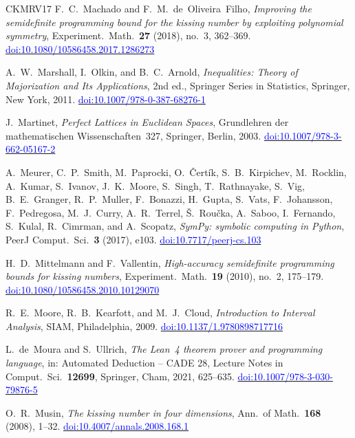 \documentclass[11pt,reqno]{amsart}
\newcommand{\bluelink}[2]{\href{#1}{\textcolor{blue}{#2}}}
\renewcommand{\_}{\origunderscore\allowbreak}
\numberwithin{equation}{section}
\theoremstyle{plain}
\theoremstyle{definition}
\theoremstyle{remark}
\begin{document}
\begin{thebibliography}{CKMRV17}
F.~C.~Machado and F.~M.~de~Oliveira~Filho,
\textit{Improving the semidefinite programming bound for the kissing number
by exploiting polynomial symmetry},
Experiment.\ Math.\ \textbf{27} (2018), no.~3, 362--369.
\bluelink{https://doi.org/10.1080/10586458.2017.1286273}{doi:10.1080/10586458.2017.1286273}

A.~W.~Marshall, I.~Olkin, and B.~C.~Arnold,
\textit{Inequalities: Theory of Majorization and Its Applications}, 2nd ed.,
Springer Series in Statistics, Springer, New York, 2011.
\bluelink{https://doi.org/10.1007/978-0-387-68276-1}{doi:10.1007/978-0-387-68276-1}

J.~Martinet,
\textit{Perfect Lattices in Euclidean Spaces},
Grundlehren der mathematischen Wissenschaften~327,
Springer, Berlin, 2003.
\bluelink{https://doi.org/10.1007/978-3-662-05167-2}{doi:10.1007/978-3-662-05167-2}

A.~Meurer, C.~P.~Smith, M.~Paprocki, O.~\v{C}ert\'ik,
S.~B.~Kirpichev, M.~Rocklin, A.~Kumar, S.~Ivanov, J.~K.~Moore,
S.~Singh, T.~Rathnayake, S.~Vig, B.~E.~Granger, R.~P.~Muller,
F.~Bonazzi, H.~Gupta, S.~Vats, F.~Johansson, F.~Pedregosa,
M.~J.~Curry, A.~R.~Terrel, \v{S}.~Rou\v{c}ka, A.~Saboo,
I.~Fernando, S.~Kulal, R.~Cimrman, and A.~Scopatz,
\textit{{S}ym{P}y: symbolic computing in {P}ython},
PeerJ Comput.\ Sci.\ \textbf{3} (2017), e103.
\bluelink{https://doi.org/10.7717/peerj-cs.103}{doi:10.7717/peerj-cs.103}

H.~D.~Mittelmann and F.~Vallentin,
\textit{High-accuracy semidefinite programming bounds for kissing numbers},
Experiment.\ Math.\ \textbf{19} (2010), no.~2, 175--179.
\bluelink{https://doi.org/10.1080/10586458.2010.10129070}{doi:10.1080/10586458.2010.10129070}

R.~E.~Moore, R.~B.~Kearfott, and M.~J.~Cloud,
\textit{Introduction to Interval Analysis},
SIAM, Philadelphia, 2009.
\bluelink{https://doi.org/10.1137/1.9780898717716}{doi:10.1137/1.9780898717716}

L.~de~Moura and S.~Ullrich,
\textit{The {L}ean~4 theorem prover and programming language},
in: Automated Deduction -- CADE 28, Lecture Notes in Comput.\ Sci.\ \textbf{12699},
Springer, Cham, 2021, 625--635.
\bluelink{https://doi.org/10.1007/978-3-030-79876-5_37}{doi:10.1007/978-3-030-79876-5\_37}

O.~R.~Musin,
\textit{The kissing number in four dimensions},
Ann.\ of Math.\ \textbf{168} (2008), 1--32.
\bluelink{https://doi.org/10.4007/annals.2008.168.1}{doi:10.4007/annals.2008.168.1}


\end{thebibliography}
\end{document}
